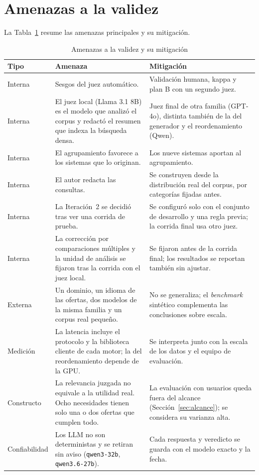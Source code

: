 \section{Amenazas a la validez}
\label{sec:met-validez}

La Tabla~\ref{tab:met-validez} resume las amenazas principales y su mitigación.

\begin{table}[!htb]
    \centering
    \caption{Amenazas a la validez y su mitigación}
    \label{tab:met-validez}
    \footnotesize
    \begin{tabular}{|p{2cm}|p{6.3cm}|p{5.9cm}|}
        \hline
        \textbf{Tipo} & \textbf{Amenaza} & \textbf{Mitigación} \\
        \hline
        Interna & Sesgos del juez automático. & Validación humana, kappa y plan B con un segundo juez. \\
        \hline
        Interna & El juez local (Llama 3.1 8B) es el modelo que analizó el corpus y redactó el resumen que indexa la búsqueda densa. & Juez final de otra familia (GPT-4o), distinta también de la del generador y el reordenamiento (Qwen). \\
        \hline
        Interna & El agrupamiento favorece a los sistemas que lo originan. & Los nueve sistemas aportan al agrupamiento. \\
        \hline
        Interna & El autor redacta las consultas. & Se construyen desde la distribución real del corpus, por categorías fijadas antes. \\
        \hline
        Interna & La Iteración~2 se decidió tras ver una corrida de prueba. & Se configuró solo con el conjunto de desarrollo y una regla previa; la corrida final usa otro juez. \\
        \hline
        Interna & La corrección por comparaciones múltiples y la unidad de análisis se fijaron tras la corrida con el juez local. & Se fijaron antes de la corrida final; los resultados se reportan también sin ajustar. \\
        \hline
        Externa & Un dominio, un idioma de las ofertas, dos modelos de la misma familia y un corpus real pequeño. & No se generaliza; el \textit{benchmark} sintético complementa las conclusiones sobre escala. \\
        \hline
        Medición & La latencia incluye el protocolo y la biblioteca cliente de cada motor; la del reordenamiento depende de la GPU. & Se interpreta junto con la escala de los datos y el equipo de evaluación. \\
        \hline
        Constructo & La relevancia juzgada no equivale a la utilidad real. Ocho necesidades tienen solo una o dos ofertas que cumplen todo. & La evaluación con usuarios queda fuera del alcance (Sección~\ref{sec:alcance}); se considera su varianza alta. \\
        \hline
        Confiabilidad & Los LLM no son deterministas y se retiran sin aviso (\texttt{qwen3-32b}, \texttt{qwen3.6-27b}). & Cada respuesta y veredicto se guarda con el modelo exacto y la fecha. \\
        \hline
    \end{tabular}
\end{table}


